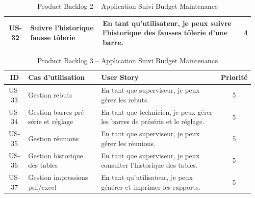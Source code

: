 \documentclass[11pt,a4paper]{article}
\begin{document}
\begin{enumerate}
\begin{table}[H]
\begin{tabular}{|c|p{5cm}|p{7cm}|c|}
\hline
US-32 & Suivre l'historique fausse tôlerie & En tant qu’utilisateur, je peux suivre l'historique des fausses tôlerie d'une barre. & 4 \\
\hline
\end{tabular}
\caption{Product Backlog  2 – Application Suivi Budget Maintenance }
\end{table}


\newpage
\begin{table}[H]
\centering
\begin{tabular}{|c|p{5cm}|p{7cm}|c|}
\hline
\textbf{ID} & \textbf{Cas d’utilisation} & \textbf{User Story} & \textbf{Priorité} \\
\hline
US-33 & Gestion rebuts & En tant que superviseur, je peux gérer les rebuts. & 5 \\
\hline
US-34 & Gestion barres pré-série et réglage & En tant que technicien, je peux gérer les barres de présérie et le réglage. & 5 \\
\hline
US-35 & Gestion réunions & En tant que superviseur, je peux gérer les réunions. & 5 \\
\hline
US-36 & Gestion historique des tables & En tant que superviseur, je peux consulter l’historique des tables. & 5 \\
\hline
US-37 & Gestion impressions pdf/excel & En tant qu’utilisateur, je peux générer et imprimer les rapports. & 5 \\
\hline
\end{tabular}
\caption{Product Backlog  3 – Application Suivi Budget Maintenance }
\end{table}


\end{enumerate}
\end{document}
